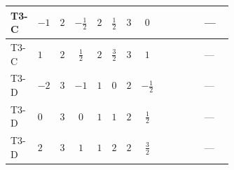 \documentclass[8pt]{article}
\begin{document}
\begin{landscape}
\begin{longtable}{@{}llcccccc >{\raggedright\arraybackslash}p{0.21\linewidth} >{\raggedright\arraybackslash}p{0.21\linewidth} >{\raggedright\arraybackslash}p{0.21\linewidth}@{}}
\midrule
T3-C & $-1$ & $2$ & $-\frac{1}{2}$ & $2$ & $\frac{1}{2}$ & $3$ & $0$ & \scriptsize\adjustbox{max width=\linewidth}{$\begin{gathered} +4 {\lambda_{HS_2}^{(1)}}^2\end{gathered}$} & \scriptsize\adjustbox{max width=\linewidth}{$\begin{gathered} +6 {\lambda_{HS_2}^{(1)}} {\lambda_{S_2}^{(1)}}\end{gathered}$} & --- \\
\midrule
T3-C & $1$ & $2$ & $\frac{1}{2}$ & $2$ & $\frac{3}{2}$ & $3$ & $1$ & \scriptsize\adjustbox{max width=\linewidth}{$\begin{gathered} +4 {\lambda_{HS_2}^{(1)}}^2\end{gathered}$} & \scriptsize\adjustbox{max width=\linewidth}{$\begin{gathered} +6 {\lambda_{HS_2}^{(1)}} {\lambda_{S_2}^{(1)}}\end{gathered}$} & --- \\
\midrule
T3-D & $-2$ & $3$ & $-1$ & $1$ & $0$ & $2$ & $-\frac{1}{2}$ & \scriptsize\adjustbox{max width=\linewidth}{$\begin{gathered} +4 {\lambda_{HS_2}^{(1)}}^2\end{gathered}$} & \scriptsize\adjustbox{max width=\linewidth}{$\begin{gathered} +4 {\lambda_{HS_2}^{(1)}} {\lambda_{S_2}^{(1)}}\end{gathered}$} & --- \\
\midrule
T3-D & $0$ & $3$ & $0$ & $1$ & $1$ & $2$ & $\frac{1}{2}$ & \scriptsize\adjustbox{max width=\linewidth}{$\begin{gathered} +4 {\lambda_{HS_2}^{(1)}}^2\end{gathered}$} & \scriptsize\adjustbox{max width=\linewidth}{$\begin{gathered} +4 {\lambda_{HS_2}^{(1)}} {\lambda_{S_2}^{(1)}}\end{gathered}$} & --- \\
\midrule
T3-D & $2$ & $3$ & $1$ & $1$ & $2$ & $2$ & $\frac{3}{2}$ & \scriptsize\adjustbox{max width=\linewidth}{$\begin{gathered} +4 {\lambda_{HS_2}^{(1)}}^2\end{gathered}$} & \scriptsize\adjustbox{max width=\linewidth}{$\begin{gathered} +4 {\lambda_{HS_2}^{(1)}} {\lambda_{S_2}^{(1)}}\end{gathered}$} & --- \\
\midrule

\end{longtable}
\end{landscape}
\end{document}

